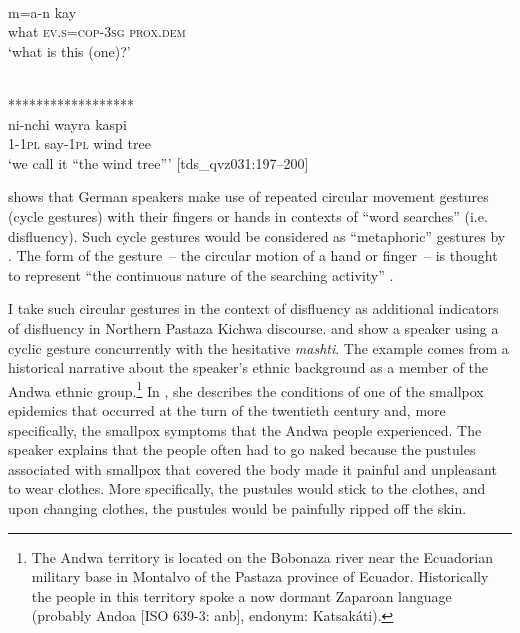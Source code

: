 \documentclass[output=paper]{langscibook}
\begin{document}
\ex \label{ex:rice:31c}
\gl {*********************}\\
 {m=a-n} {kay}\\
{what} {\textsc{ev.s=cop-3sg}} {\textsc{prox.dem}}\\
\glt ‘what is this (one)?’
\medskip

\ex \label{ex:rice:31d}
 {} \\
{******************} {\hspace{3mm}{***********}} \\ \linebreak 
{} {ni-nchi} {wayra}  {kaspi} \\
{1-1\textsc{pl}} {say-\textsc{1pl}} {wind} {tree} \\
\glt ‘we call it “the wind tree”’ [tds\_qvz031:197--200]
\z
\z

\citet{Ladewig2011} shows that German speakers make use of repeated circular movement gestures (cycle gestures) with their fingers or hands in contexts of “word searches” (i.e. disfluency). Such cycle gestures would be considered as “metaphoric” gestures by \citet{Betz2023}. The form of the gesture~-- the circular motion of a hand or finger~-- is thought to represent “the continuous nature of the searching activity” \citep[8]{Ladewig2011}. 

 I take such circular gestures in the context of disfluency as additional indicators of disfluency in Northern Pastaza Kichwa discourse.  and  show a speaker using a cyclic gesture concurrently with the hesitative \textit{mashti}. The example comes from a historical narrative about the speaker’s ethnic background as a member of the Andwa ethnic group.\footnote{The Andwa territory is located on the Bobonaza river near the Ecuadorian military base in Montalvo of the Pastaza province of Ecuador. Historically the people in this territory spoke a now dormant Zaparoan language (probably Andoa [ISO 639-3: anb], endonym: Katsakáti).} In , she describes the conditions of one of the smallpox epidemics that occurred at the turn of the twentieth century and, more specifically, the smallpox symptoms that the Andwa people experienced. The speaker explains that the people often had to go naked because the pustules associated with smallpox that covered the body made it painful and unpleasant to wear clothes. More specifically, the pustules would stick to the clothes, and upon changing clothes, the pustules would be painfully ripped off the skin.
\end{document}
